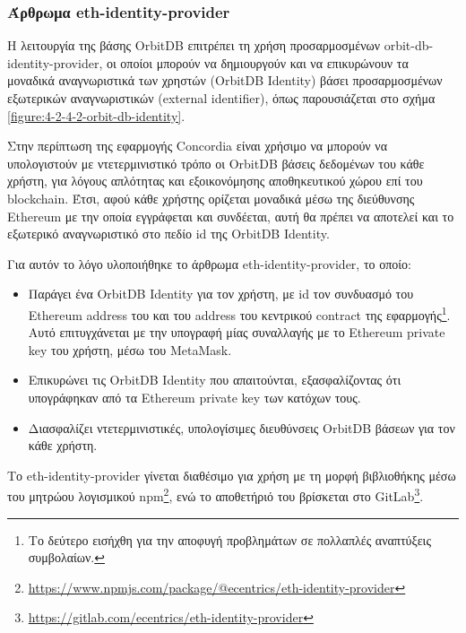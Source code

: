 \subsubsection{Άρθρωμα eth-identity-provider} \label{subsubsection:4-3-1-3-eth-identity-provider-module}

Η λειτουργία της βάσης OrbitDB επιτρέπει τη χρήση προσαρμοσμένων  orbit-db-identity-provider, οι οποίοι μπορούν να δημιουργούν και να επικυρώνουν
τα μοναδικά αναγνωριστικά των χρηστών (OrbitDB Identity) βάσει προσαρμοσμένων εξωτερικών αναγνωριστικών (external identifier), όπως παρουσιάζεται στο σχήμα \ref{figure:4-2-4-2-orbit-db-identity}.

Στην περίπτωση της εφαρμογής Concordia είναι χρήσιμο να μπορούν να υπολογιστούν με ντετερμινιστικό τρόπο οι OrbitDB βάσεις δεδομένων του κάθε χρήστη, για λόγους απλότητας και εξοικονόμησης αποθηκευτικού χώρου επί του blockchain. Έτσι, αφού κάθε χρήστης ορίζεται μοναδικά μέσω της διεύθυνσης Ethereum με την οποία εγγράφεται και συνδέεται, αυτή θα πρέπει να αποτελεί και το εξωτερικό αναγνωριστικό στο πεδίο id της OrbitDB Identity.

\newpage
Για αυτόν το λόγο υλοποιήθηκε το άρθρωμα eth-identity-provider, το οποίο:

\begin{itemize}
	\item Παράγει ένα OrbitDB Identity για τον χρήστη, με id τον συνδυασμό του Ethereum address του και του address του κεντρικού contract της εφαρμογής\footnote{Το δεύτερο εισήχθη για την αποφυγή προβλημάτων σε πολλαπλές αναπτύξεις συμβολαίων.}. Αυτό επιτυγχάνεται με την υπογραφή μίας συναλλαγής με το Ethereum private key του χρήστη, μέσω του MetaMask.
	\item Επικυρώνει τις OrbitDB Identity που απαιτούνται, εξασφαλίζοντας ότι υπογράφηκαν από τα Ethereum private key των κατόχων τους. 
	\item Διασφαλίζει ντετερμινιστικές, υπολογίσιμες διευθύνσεις OrbitDB βάσεων για τον κάθε χρήστη.
\end{itemize}

Το eth-identity-provider γίνεται διαθέσιμο για χρήση με τη μορφή βιβλιοθήκης μέσω του μητρώου λογισμικού npm\footnote{\url{https://www.npmjs.com/package/@ecentrics/eth-identity-provider}}, ενώ το αποθετήριό του βρίσκεται στο GitLab\footnote{\url{https://gitlab.com/ecentrics/eth-identity-provider}}.
